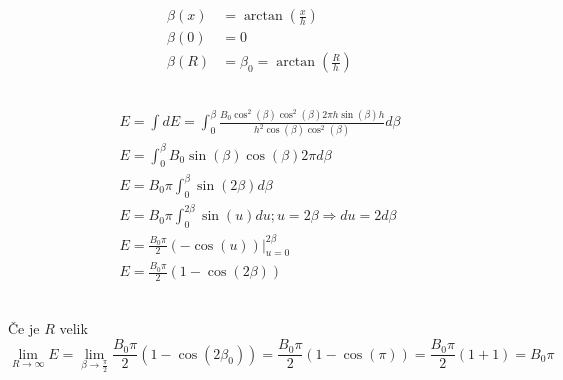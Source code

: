 \documentclass[a4paper,12pt]{article}
\begin{document}
\subsection{}
\begin{align}
    \beta(x) & = \arctan\left(\frac{x}{h}\right)           \\
    \beta(0) & = 0                                         \\
    \beta(R) & = \beta_0 = \arctan\left(\frac{R}{h}\right)
\end{align}

\subsection{}
\begin{align}
    E = \int dE = \int_0^{\beta} \frac{B_0 \cos^2(\beta) \cos^2(\beta) 2\pi h \sin(\beta) h}{h^2 \cos(\beta) \cos^2(\beta)} d\beta \\
    E = \int_0^\beta B_0 \sin(\beta) \cos(\beta) 2 \pi d\beta                                                                      \\
    E = B_0 \pi \int_0^{\beta} \sin(2 \beta) d\beta                                                                                \\
    E = B_0 \pi \int_0^{2 \beta} \sin(u) du; u = 2\beta \Rightarrow du = 2 d\beta                                                  \\
    E = \frac{B_0 \pi}{2} (-\cos(u)) \vert_{u=0}^{2\beta}                                                                          \\
    E = \frac{B_0 \pi}{2} (1 - \cos(2\beta))                                                                                       \\
\end{align}

\subsection{}
Če je $R$ velik
\begin{equation}
    \lim_{R \to \infty} E = \lim_{\beta \to \frac{\pi}{2}} \frac{B_0 \pi}{2} (1 - \cos(2\beta_0)) = \frac{B_0 \pi}{2} (1 - \cos(\pi)) = \frac{B_0 \pi}{2} (1 + 1) = B_0 \pi
\end{equation}
\end{document}
